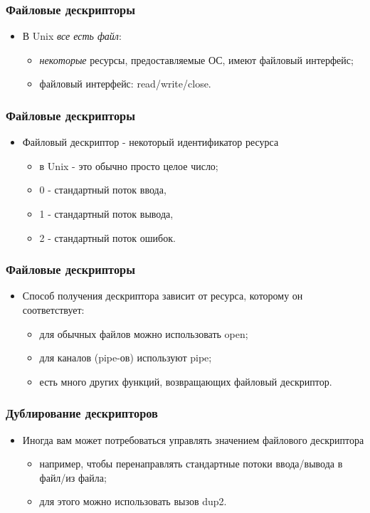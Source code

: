 \begin{frame}
\frametitle{Файловые дескрипторы}
\begin{itemize}
   \item<1->В Unix \emph{все есть файл}:
   \begin{itemize}
       \item<2->\emph{некоторые} ресурсы, предоставляемые ОС, имеют файловый
            интерфейс;
       \item<3->файловый интерфейс: read/write/close.
   \end{itemize}
\end{itemize}
\end{frame}

\begin{frame}
\frametitle{Файловые дескрипторы}
\begin{itemize}
    \item<1->Файловый дескриптор - некоторый идентификатор ресурса
    \begin{itemize}
        \item<2->в Unix - это обычно просто целое число;
        \item<3->0 - стандартный поток ввода,
        \item<3->1 - стандартный поток вывода,
        \item<3->2 - стандартный поток ошибок.
    \end{itemize}
\end{itemize}
\end{frame}

\begin{frame}
\frametitle{Файловые дескрипторы}
\begin{itemize}
    \item<1->Способ получения дескриптора зависит от ресурса, которому он
         соответствует:
    \begin{itemize}
        \item<2->для обычных файлов можно использовать open;
        \item<3->для каналов (pipe-ов) используют pipe;
        \item<4->есть много других функций, возвращающих файловый дескриптор.
    \end{itemize}
\end{itemize}
\end{frame}

\begin{frame}
\frametitle{Дублирование дескрипторов}
\begin{itemize}
    \item<1->Иногда вам может потребоваться управлять значением файлового
         дескриптора
    \begin{itemize}
        \item<2->например, чтобы перенаправлять стандартные потоки
             ввода/вывода в файл/из файла;
        \item<3->для этого можно использовать вызов dup2.
    \end{itemize}
\end{itemize}
\end{frame}

